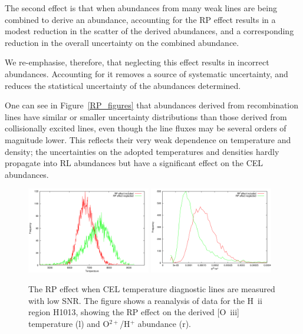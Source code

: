 \documentclass[useAMS,usenatbib]{mn2e}
\begin{document}
The second effect is that when abundances from many weak lines are being combined to derive an abundance, accounting for the RP effect results in a modest reduction in the scatter of the derived abundances, and a corresponding reduction in the overall uncertainty on the combined abundance.

We re-emphasise, therefore, that neglecting this effect results in incorrect abundances.  Accounting for it removes a source of systematic uncertainty, and reduces the statistical uncertainty of the abundances determined.

One can see in Figure~\ref{RP_figures} that abundances derived from recombination lines have similar or smaller uncertainty distributions than those derived from collisionally excited lines, even though the line fluxes may be several orders of magnitude lower.  This reflects their very weak dependence on temperature and density; the uncertainties on the adopted temperatures and densities hardly propagate into RL abundances but have a significant effect on the CEL abundances.

\begin{figure}
\includegraphics[width=0.48\textwidth]{figures/h1013_rp_temperature.png}
\includegraphics[width=0.48\textwidth]{figures/h1013_rp_abundance.png}
\caption{The RP effect when CEL temperature diagnostic lines are measured with low SNR.  The figure shows a reanalysis of data for the H~{\sc ii} region H1013, showing the RP effect on the derived [O~{\sc iii}] temperature (l) and O$^{2+}$/H$^+$ abundance (r).}
\label{h1013_RP_effect}
\end{figure}
\end{document}
